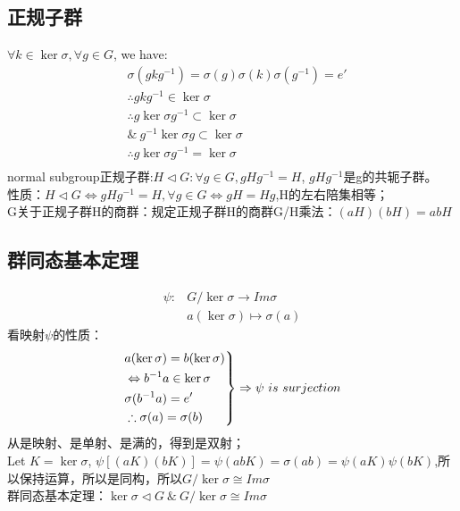 \documentclass[UTF8]{article}
\begin{document}
\subsection{正规子群}
$ \forall k \in \ker \sigma, \forall g\in G$, we have:
\begin{equation}
\begin{split}
&\sigma(gkg^{-1})=\sigma(g)\sigma(k)\sigma(g^{-1})=e'\\
& \therefore gkg^{-1}\in \ker \sigma\\
& \therefore g \ker \sigma g^{-1} \subset \ker \sigma\\
& \& \ g^{-1}  \ker \sigma g\subset \ker \sigma\\
& \therefore g \ker \sigma g^{-1}=\ker \sigma\\
\end{split}
\end{equation}
normal subgroup正规子群:$H \lhd G :\forall g \in G, gHg^{-1}=H$, $gHg^{-1}$是g的共轭子群。\\
性质：$H \lhd G \Leftrightarrow gHg^{-1}=H,\forall g \in G \Leftrightarrow gH=Hg$,H的左右陪集相等；\\
G关于正规子群H的商群：规定正规子群H的商群G/H乘法：$(aH)(bH)=abH$\\
\subsection{群同态基本定理}
\begin{equation}
\begin{split}
\psi : &G/ \ker \sigma \to Im \sigma\\
& a (\ker \sigma) \mapsto \sigma(a)
\end{split}
\end{equation}
看映射$\psi$的性质：
\begin{equation}
\label{证明同构1}
\left.
\begin{aligned}
& a(\ker \sigma)=b(\ker \sigma)\\
& \Leftrightarrow b^{-1}a \in \ker \sigma\\
&\sigma(b^{-1}a)=e'\\
&\therefore \sigma(a)=\sigma(b)
\end{aligned}
\right\} \Rightarrow \psi \ is \ surjection\\
\end{equation}
从是映射、是单射、是满的，得到是双射；\\
Let $K=\ker \sigma$, $\psi [(aK)(bK)]=\psi (abK)=\sigma(ab)=\psi(aK)\psi(bK)$,所以保持运算，所以是同构，所以$G/ \ker \sigma \cong Im \sigma$\\
群同态基本定理：$\ker \sigma \lhd G \ \& \   G/ \ker \sigma \cong Im \sigma  $ 
\end{document}
